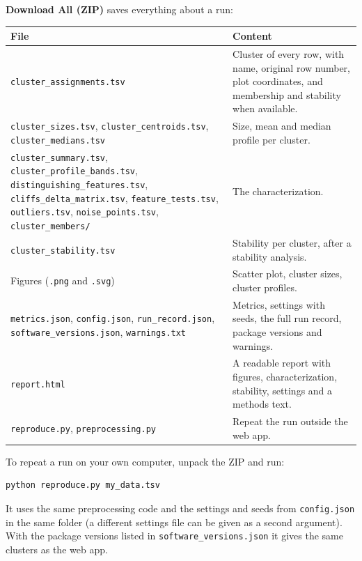 \documentclass[11pt,a4paper]{article}
\newcommand{\ui}[1]{\textsf{\textbf{#1}}}   %
\begin{document}
\ui{Download All (ZIP)} saves everything about a run:

\begin{center}
\small
\begin{tabularx}{\textwidth}{>{\raggedright\arraybackslash}p{}L}
\toprule
File & Content\\
\midrule
\texttt{cluster\_assignments.tsv} & Cluster of every row, with name, original row number, plot coordinates, and
  membership and stability when available.\\
\texttt{cluster\_sizes.tsv}, \texttt{cluster\_centroids.tsv}, \texttt{cluster\_medians.tsv} & Size, mean and
  median profile per cluster.\\
\texttt{cluster\_summary.tsv}, \texttt{cluster\_profile\_bands.tsv}, \texttt{distinguishing\_features.tsv},
  \texttt{cliffs\_delta\_matrix.tsv}, \texttt{feature\_tests.tsv}, \texttt{outliers.tsv},
  \texttt{noise\_points.tsv}, \texttt{cluster\_members/} & The characterization.\\
\texttt{cluster\_stability.tsv} & Stability per cluster, after a stability analysis.\\
Figures (\texttt{.png} and \texttt{.svg}) & Scatter plot, cluster sizes, cluster profiles.\\
\texttt{metrics.json}, \texttt{config.json}, \texttt{run\_record.json}, \texttt{software\_versions.json},
  \texttt{warnings.txt} & Metrics, settings with seeds, the full run record, package versions and warnings.\\
\texttt{report.html} & A readable report with figures, characterization, stability, settings and a methods text.\\
\texttt{reproduce.py}, \texttt{preprocessing.py} & Repeat the run outside the web app.\\
\bottomrule
\end{tabularx}
\end{center}

To repeat a run on your own computer, unpack the ZIP and run:

\begin{lstlisting}
python reproduce.py my_data.tsv
\end{lstlisting}

It uses the same preprocessing code and the settings and seeds from \texttt{config.json} in the same folder (a
different settings file can be given as a second argument). With the package versions listed in
\texttt{software\_versions.json} it gives the same clusters as the web app.
\end{document}
